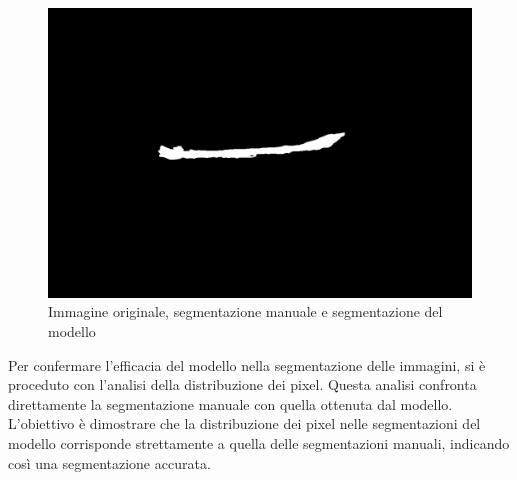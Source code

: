 \begin{figure}[!ht]
\begin{minipage}{0.32\textwidth}
	\end{minipage}
	\hfill %
	\begin{minipage}{0.32\textwidth}
		\centering
		\includegraphics[width=\linewidth]{Immagini/prediction.png}
	\end{minipage}

	\caption{Immagine originale, segmentazione manuale e segmentazione del modello}
	\label{fig:immagine originale, segmentazione manuale e segmentazione del modello}
\end{figure}




Per confermare l'efficacia del modello nella segmentazione delle immagini, si è proceduto con
l'analisi della distribuzione dei pixel. Questa analisi confronta direttamente la segmentazione
manuale con quella ottenuta dal modello. L'obiettivo è dimostrare che la distribuzione dei pixel
nelle segmentazioni del modello corrisponde strettamente a quella delle segmentazioni manuali,
indicando così una segmentazione accurata.



